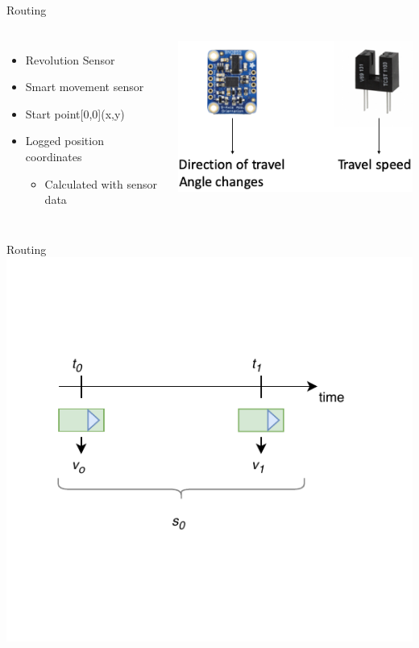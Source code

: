 \documentclass{beamer}
\begin{document}
\begin{frame}{Routing}
\begin{columns}
\begin{itemize}
\item Revolution Sensor
\item Smart movement sensor
\item Start point[0,0](x,y)
\item Logged position coordinates
	\begin{itemize}
	\item Calculated with sensor data
	\end{itemize}
\end{itemize}
\includegraphics[scale=0.4]{sources/manu_5.png}
\end{columns}
\end{frame}

\begin{frame}{Routing}
\centering
\includegraphics[page=6,scale=0.8]{sources/Rounting_1.pdf}
\end{frame}
\end{document}
